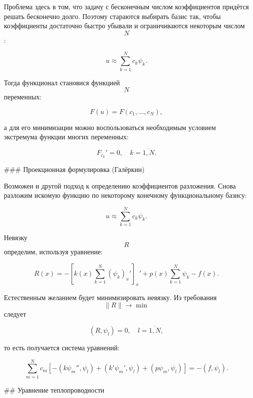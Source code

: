Проблема здесь в том, что задачу с бесконечным числом коэффициентов придётся решать бесконечно долго. Поэтому стараются выбирать базис так, чтобы коэффициенты достаточно быстро убывали и ограничиваются некоторым числом $$ N $$:

$$
  u \approx \sum\limits_{k=1}^N c_k \psi_k.
$$

Тогда функционал становися функцией $$ N $$ переменных:

$$
  F(u) = F(c_1,\ldots,c_N),
$$

а для его минимизации можно воспользоваться необходимым условием экстремума функции многих переменных:

$$
  F_{c_k}' = 0, \quad k = \overline{1,N}.
$$

### Проекционная формулировка (Галёркин)

Возможен и другой подход к определению коэффициентов разложения. Снова разложим искомую функцию по некоторому конечному функциональному базису:

$$
  u \approx \sum\limits_{k=1}^N c_k \psi_k.
$$

Невязку $$ R $$ определим, используя уравнение:

$$
  R(x) = -\left[k(x) \sum\limits_{k=1}^N(\psi_k)_x'\right]_x' +
  p(x)\sum\limits_{k=1}^N\psi_k - f(x).
$$

Естественным желанием будет минимизировать невязку. Из требования
$$ \|R\| \to \min $$ следует

$$
  (R, \psi_l) = 0,\quad l = \overline{1,N},
$$

то есть получается система уравнений:

$$
  \sum\limits_{m=1}^N c_m \left[-(k\psi_m'', \psi_l) + (k'\psi_m', \psi_l) +
  (p\psi_m, \psi_l)\right] = -(f, \psi_l).
$$

## Уравнение теплопроводности
